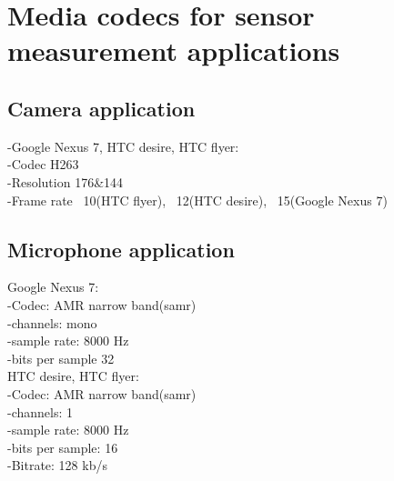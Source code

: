 \section{Media codecs for sensor measurement applications}
\subsection{Camera application}	
	-Google Nexus 7, HTC desire, HTC flyer:\\
					-Codec H263\\
					-Resolution	176\&144\\
					-Frame rate		~10(HTC flyer),	~12(HTC desire),	~15(Google Nexus 7)\\
					
					
					
\subsection{Microphone application}		
		Google Nexus 7:\\
			-Codec: AMR narrow band(samr)\\
			-channels: 		mono\\
			-sample rate:	8000 Hz\\
			-bits per sample 	32\\
		HTC desire, HTC flyer:\\
			-Codec: AMR narrow band(samr)\\
			-channels:		1\\
			-sample rate:	8000 Hz\\
			-bits per sample:	16\\
			-Bitrate:		128 kb/s	\\